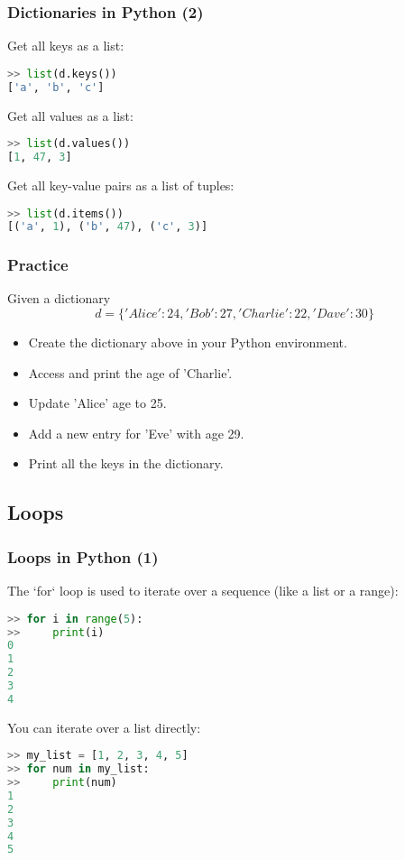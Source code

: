 \begin{frame}[fragile]
  \frametitle{Dictionaries in Python (2)}
  Get all keys as a list:
  \begin{lstlisting}[language=Python]
>> list(d.keys())
['a', 'b', 'c']
  \end{lstlisting}\pause
  Get all values as a list:
  \begin{lstlisting}[language=Python]
>> list(d.values())
[1, 47, 3]
  \end{lstlisting}\pause
  Get all key-value pairs as a list of tuples:
  \begin{lstlisting}[language=Python]
>> list(d.items())
[('a', 1), ('b', 47), ('c', 3)]
  \end{lstlisting}
\end{frame}

\begin{frame}[fragile]
  \frametitle{Practice}
  Given a dictionary
  \[
     d = \{ 'Alice': 24, 'Bob': 27, 'Charlie': 22, 'Dave': 30 \}
  \]
  \begin{itemize}
   \item Create the dictionary above in your Python environment.\pause
   \item Access and print the age of 'Charlie'.\pause
   \item Update 'Alice' age to 25.\pause
   \item Add a new entry for 'Eve' with age 29.\pause
   \item Print all the keys in the dictionary.
  \end{itemize}
 \end{frame}

\subsection*{Loops}
\begin{frame}[fragile]
  \frametitle{Loops in Python (1)}
  The `for` loop is used to iterate over a sequence (like a list or a range):
  \begin{lstlisting}[language=Python]
>> for i in range(5):
>>     print(i)
0
1
2
3
4
  \end{lstlisting}\pause
  You can iterate over a list directly:
  \begin{lstlisting}[language=Python]
>> my_list = [1, 2, 3, 4, 5]
>> for num in my_list:
>>     print(num)
1
2
3
4
5
  \end{lstlisting}
\end{frame}

